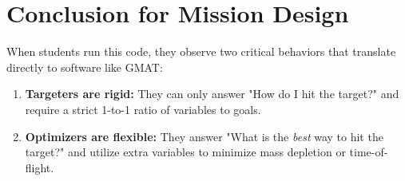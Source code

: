\documentclass[11pt, letterpaper]{article}
\begin{document}
\section*{Conclusion for Mission Design}
When students run this code, they observe two critical behaviors that translate directly to software like GMAT:
\begin{enumerate}
    \item \textbf{Targeters are rigid:} They can only answer "How do I hit the target?" and require a strict 1-to-1 ratio of variables to goals.
    \item \textbf{Optimizers are flexible:} They answer "What is the \textit{best} way to hit the target?" and utilize extra variables to minimize mass depletion or time-of-flight.
\end{enumerate}
\end{document}
